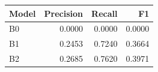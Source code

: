 \begin{tabular}{lrrr}
\toprule
Model & Precision & Recall & F1 \\
\midrule
B0 & 0.0000 & 0.0000 & 0.0000 \\
B1 & 0.2453 & 0.7240 & 0.3664 \\
B2 & 0.2685 & 0.7620 & 0.3971 \\
\bottomrule
\end{tabular}
